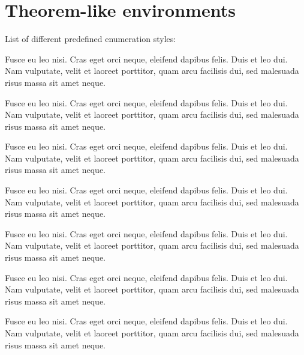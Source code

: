 \documentclass[a4paper,UKenglish,cleveref, autoref]{lipics-v2019}
\begin{document}
\section{Theorem-like environments}\label{sec:theorem-environments}

List of different predefined enumeration styles:

\begin{theorem}\label{testenv-theorem}
Fusce eu leo nisi. Cras eget orci neque, eleifend dapibus felis. Duis et leo dui. Nam vulputate, velit et laoreet porttitor, quam arcu facilisis dui, sed malesuada risus massa sit amet neque.
\end{theorem}

\begin{lemma}\label{testenv-lemma}
Fusce eu leo nisi. Cras eget orci neque, eleifend dapibus felis. Duis et leo dui. Nam vulputate, velit et laoreet porttitor, quam arcu facilisis dui, sed malesuada risus massa sit amet neque.
\end{lemma}

\begin{corollary}\label{testenv-corollary}
Fusce eu leo nisi. Cras eget orci neque, eleifend dapibus felis. Duis et leo dui. Nam vulputate, velit et laoreet porttitor, quam arcu facilisis dui, sed malesuada risus massa sit amet neque.
\end{corollary}

\begin{proposition}\label{testenv-proposition}
Fusce eu leo nisi. Cras eget orci neque, eleifend dapibus felis. Duis et leo dui. Nam vulputate, velit et laoreet porttitor, quam arcu facilisis dui, sed malesuada risus massa sit amet neque.
\end{proposition}

\begin{exercise}\label{testenv-exercise}
Fusce eu leo nisi. Cras eget orci neque, eleifend dapibus felis. Duis et leo dui. Nam vulputate, velit et laoreet porttitor, quam arcu facilisis dui, sed malesuada risus massa sit amet neque.
\end{exercise}

\begin{definition}\label{testenv-definition}
Fusce eu leo nisi. Cras eget orci neque, eleifend dapibus felis. Duis et leo dui. Nam vulputate, velit et laoreet porttitor, quam arcu facilisis dui, sed malesuada risus massa sit amet neque.
\end{definition}

\begin{example}\label{testenv-example}
Fusce eu leo nisi. Cras eget orci neque, eleifend dapibus felis. Duis et leo dui. Nam vulputate, velit et laoreet porttitor, quam arcu facilisis dui, sed malesuada risus massa sit amet neque.
\end{example}
\end{document}
